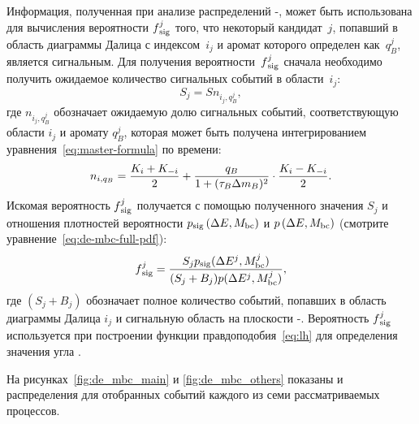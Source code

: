 Информация, полученная при анализе распределений \de-\mbc, может быть использована для вычисления вероятности $f{}_{\mathrm{sig}}^j$ того, что некоторый кандидат~$j$, попавший в область диаграммы Далица с индексом~$i_j$ и аромат которого определен как~$q_B^j$, является сигнальным.  Для получения вероятности~$f{}_{\mathrm{sig}}^j$ сначала необходимо получить ожидаемое количество сигнальных событий в области~$i_j$:
\begin{equation}
 S_j = Sn_{i_j,q^j_B},
\end{equation}
где $n_{i_j,q^j_B}$ обозначает ожидаемую долю сигнальных событий, соответствующую области $i_j$ и аромату $q_B^j$, которая может быть получена интегрированием уравнения~\eqref{eq:master-formula} по времени:
\begin{equation}\label{eq:nsig-prediction-with-tag}
   n_{i,q_B} =\frac{K_i + K_{-i}}{2} + \frac{q_B}{1+(\tau_B\Delta m_B)^2}\cdot\frac{K_i - K_{-i}}{2}.
\end{equation}
Искомая вероятность $f{}_{\mathrm{sig}}^j$ получается с помощью полученного значения $S_j$ и отношения плотностей вероятности $p{}_{\mathrm{sig}}\left(\Delta E,M_{\mathrm{bc}}\right)$ и $p\left(\Delta E,M_{\mathrm{bc}}\right)$ (смотрите уравнение~\eqref{eq:de-mbc-full-pdf}):
\begin{equation}\label{eq:fsig_event-dependent}
  f{}_{\mathrm{sig}}^j = \frac{S_jp{}_{\mathrm{sig}}(\Delta E^j,M_{\mathrm{bc}}^j)}{(S_j + B_j)p(\Delta E^j,M_{\mathrm{bc}}^j)},
\end{equation}
где $(S_j + B_j)$ обозначает полное количество событий, попавших в область диаграммы Далица $i_j$ и сигнальную область на плоскости \de-\mbc.  Вероятность $f{}_{\mathrm{sig}}^j$ используется при построении функции правдоподобия~\eqref{eq:lh} для определения значения угла \pphi.
 
  


На рисунках~\ref{fig:de_mbc_main} и \ref{fig:de_mbc_others} показаны \de и \mbc распределения для отобранных событий каждого из семи рассматриваемых процессов.  

